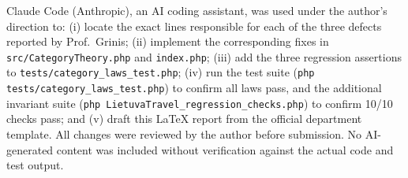 Claude Code (Anthropic), an AI coding assistant, was used under the author's direction to: (i) locate the exact lines responsible for each of the three defects reported by Prof.~Grinis; (ii) implement the corresponding fixes in \texttt{src/CategoryTheory.php} and \texttt{index.php}; (iii) add the three regression assertions to \texttt{tests/category\_laws\_test.php}; (iv) run the test suite (\texttt{php tests/category\_laws\_test.php}) to confirm all laws pass, and the additional invariant suite (\texttt{php LietuvaTravel\_regression\_checks.php}) to confirm 10/10 checks pass; and (v) draft this LaTeX report from the official department template. All changes were reviewed by the author before submission. No AI-generated content was included without verification against the actual code and test output.
